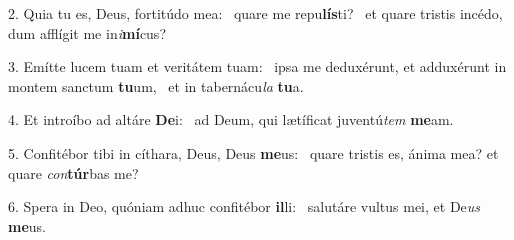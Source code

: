 2. Quia tu es, Deus, fortitúdo mea: \dag\  quare me repu\textbf{lís}ti? \ast\  et quare tristis incédo, dum afflígit me in\textit{i}\textbf{mí}cus?\

3. Emítte lucem tuam et veritátem tuam: \dag\  ipsa me deduxérunt, et adduxérunt in montem sanctum \textbf{tu}um, \ast\  et in tabernácu\textit{la} \textbf{tu}a.\

4. Et introíbo ad altáre \textbf{De}i: \ast\  ad Deum, qui lætíficat juventú\textit{tem} \textbf{me}am.\

5. Confitébor tibi in cíthara, Deus, Deus \textbf{me}us: \ast\  quare tristis es, ánima mea? et quare \textit{con}\textbf{túr}bas me?\

6. Spera in Deo, quóniam adhuc confitébor \textbf{il}li: \ast\  salutáre vultus mei, et De\textit{us} \textbf{me}us.\

